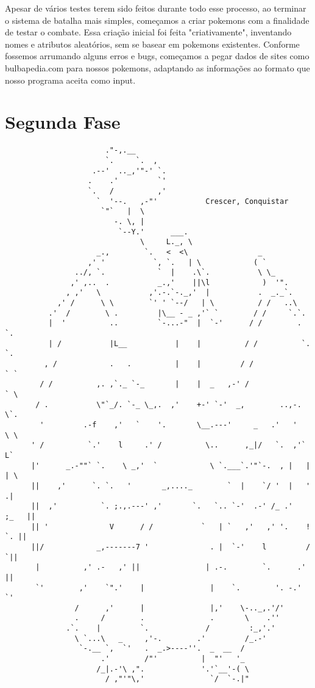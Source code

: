 \documentclass[a4paper]{article}
\begin{document}
    Apesar de vários testes terem sido feitos durante todo esse processo, ao
terminar o sistema de batalha mais simples, começamos a criar pokemons com a
finalidade de testar o combate. Essa criação inicial foi feita "criativamente",
inventando nomes e atributos aleatórios, sem se basear em pokemons existentes.
Conforme fossemos arrumando alguns erros e bugs, começamos a pegar dados de
sites como bulbapedia.com para nossos pokemons, adaptando as informações ao
formato que nosso programa aceita como input.

\newpage
\section{Segunda Fase}

\begin{verbatim}
                       ."-,.__
                       `.     `.  ,
                    .--'  .._,'"-' `.
                   .    .'         `'
                   `.   /          ,'
                     `  '--.   ,-"'           Crescer, Conquistar
                      `"`   |  \
                         -. \, |
                          `--Y.'      ___.
                               \     L._, \
                     _.,        `.   <  <\                _
                   ,' '           `, `.   | \            ( `
                ../, `.            `  |    .\`.           \ \_
               ,' ,..  .           _.,'    ||\l            )  '".
              , ,'   \           ,'.-.`-._,'  |           .  _._`.
            ,' /      \ \        `' ' `--/   | \          / /   ..\
          .'  /        \ .         |\__ - _ ,'` `        / /     `.`.
          |  '          ..         `-...-"  |  `-'      / /        . `.
          | /           |L__           |    |          / /          `. `.
         , /            .   .          |    |         / /             ` `
        / /          ,. ,`._ `-_       |    |  _   ,-' /               ` \
       / .           \"`_/. `-_ \_,.  ,'    +-' `-'  _,        ..,-.    \`.
        '         .-f    ,'   `    '.       \__.---'     _   .'   '     \ \
      ' /          `.'    l     .' /          \..      ,_|/   `.  ,'`     L`
      |'      _.-""` `.    \ _,'  `            \ `.___`.'"`-.  , |   |    | \
      ||    ,'      `. `.   '       _,...._        `  |    `/ '  |   '     .|
      ||  ,'          `. ;.,.---' ,'       `.   `.. `-'  .-' /_ .'    ;_   ||
      || '              V      / /           `   | `   ,'   ,' '.    !  `. ||
      ||/            _,-------7 '              . |  `-'    l         /    `||
       |          ,' .-   ,' ||               | .-.        `.      .'     ||
       `'        ,'    `".'    |               |    `.        '. -.'       `'
                /      ,'      |               |,'    \-.._,.'/'
                .     /        .               .       \    .''
              .`.    |         `.             /         :_,'.'
                \ `...\   _     ,'-.        .'         /_.-'
                 `-.__ `,  `'   .  _.>----''.  _  __  /
                      .'        /"'          |  "'   '_
                     /_|.-'\ ,".             '.'`__'-( \
                       / ,"'"\,'               `/  `-.|"
\end{verbatim}
\end{document}
